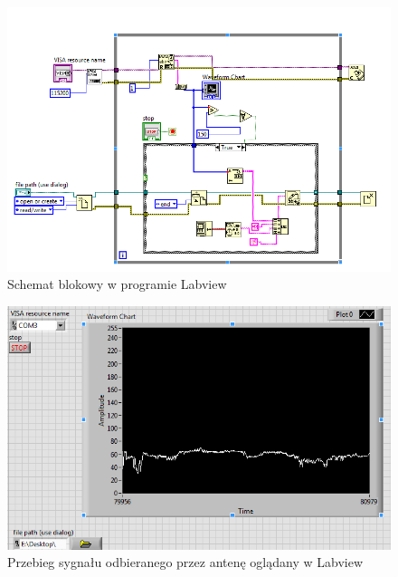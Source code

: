 \documentclass[12pt]{article}
\begin{document}
\begin{figure}[H]
\begin{center}
\includegraphics[width=1\textwidth]{figures/labview1.png}
\caption{Schemat blokowy w programie Labview}
\end{center}
\end{figure}

\begin{figure}[H]
\begin{center}
\includegraphics[width=1\textwidth]{figures/labview2.png}
\caption{Przebieg sygnału odbieranego przez antenę oglądany w Labview}
\end{center}
\end{figure}
\end{document}
